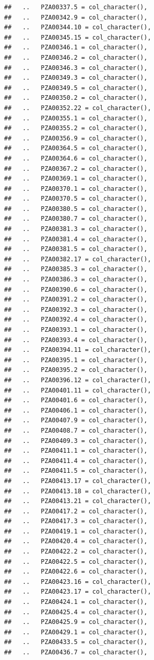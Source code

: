 \documentclass[
]{article}
\begin{document}
\begin{verbatim}
##   ..   PZA00337.5 = col_character(),
##   ..   PZA00342.9 = col_character(),
##   ..   PZA00344.10 = col_character(),
##   ..   PZA00345.15 = col_character(),
##   ..   PZA00346.1 = col_character(),
##   ..   PZA00346.2 = col_character(),
##   ..   PZA00346.3 = col_character(),
##   ..   PZA00349.3 = col_character(),
##   ..   PZA00349.5 = col_character(),
##   ..   PZA00350.2 = col_character(),
##   ..   PZA00352.22 = col_character(),
##   ..   PZA00355.1 = col_character(),
##   ..   PZA00355.2 = col_character(),
##   ..   PZA00356.9 = col_character(),
##   ..   PZA00364.5 = col_character(),
##   ..   PZA00364.6 = col_character(),
##   ..   PZA00367.2 = col_character(),
##   ..   PZA00369.1 = col_character(),
##   ..   PZA00370.1 = col_character(),
##   ..   PZA00370.5 = col_character(),
##   ..   PZA00380.5 = col_character(),
##   ..   PZA00380.7 = col_character(),
##   ..   PZA00381.3 = col_character(),
##   ..   PZA00381.4 = col_character(),
##   ..   PZA00381.5 = col_character(),
##   ..   PZA00382.17 = col_character(),
##   ..   PZA00385.3 = col_character(),
##   ..   PZA00386.3 = col_character(),
##   ..   PZA00390.6 = col_character(),
##   ..   PZA00391.2 = col_character(),
##   ..   PZA00392.3 = col_character(),
##   ..   PZA00392.4 = col_character(),
##   ..   PZA00393.1 = col_character(),
##   ..   PZA00393.4 = col_character(),
##   ..   PZA00394.11 = col_character(),
##   ..   PZA00395.1 = col_character(),
##   ..   PZA00395.2 = col_character(),
##   ..   PZA00396.12 = col_character(),
##   ..   PZA00401.11 = col_character(),
##   ..   PZA00401.6 = col_character(),
##   ..   PZA00406.1 = col_character(),
##   ..   PZA00407.9 = col_character(),
##   ..   PZA00408.7 = col_character(),
##   ..   PZA00409.3 = col_character(),
##   ..   PZA00411.1 = col_character(),
##   ..   PZA00411.4 = col_character(),
##   ..   PZA00411.5 = col_character(),
##   ..   PZA00413.17 = col_character(),
##   ..   PZA00413.18 = col_character(),
##   ..   PZA00413.21 = col_character(),
##   ..   PZA00417.2 = col_character(),
##   ..   PZA00417.3 = col_character(),
##   ..   PZA00419.1 = col_character(),
##   ..   PZA00420.4 = col_character(),
##   ..   PZA00422.2 = col_character(),
##   ..   PZA00422.5 = col_character(),
##   ..   PZA00422.6 = col_character(),
##   ..   PZA00423.16 = col_character(),
##   ..   PZA00423.17 = col_character(),
##   ..   PZA00424.1 = col_character(),
##   ..   PZA00425.4 = col_character(),
##   ..   PZA00425.9 = col_character(),
##   ..   PZA00429.1 = col_character(),
##   ..   PZA00433.5 = col_character(),
##   ..   PZA00436.7 = col_character(),

\end{verbatim}
\end{document}
